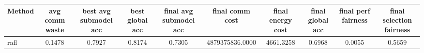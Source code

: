 \begin{tabular}{lccccccccc}
\toprule
Method & avg comm waste & best avg submodel acc & best global acc & final avg submodel acc & final comm cost & final energy cost & final global acc & final perf fairness & final selection fairness \\
\midrule
rafl & 0.1478 & 0.7927 & 0.8174 & 0.7305 & 4879375836.0000 & 4661.3258 & 0.6968 & 0.0055 & 0.5659 \\
\bottomrule
\end{tabular}
